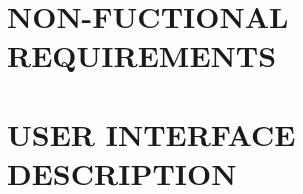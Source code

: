 \documentclass[11pt, twoside, a4paper]{book}
\begin{document}
	\chapter{NON-FUCTIONAL REQUIREMENTS}
	
	\chapter{USER INTERFACE DESCRIPTION}
\end{document}
